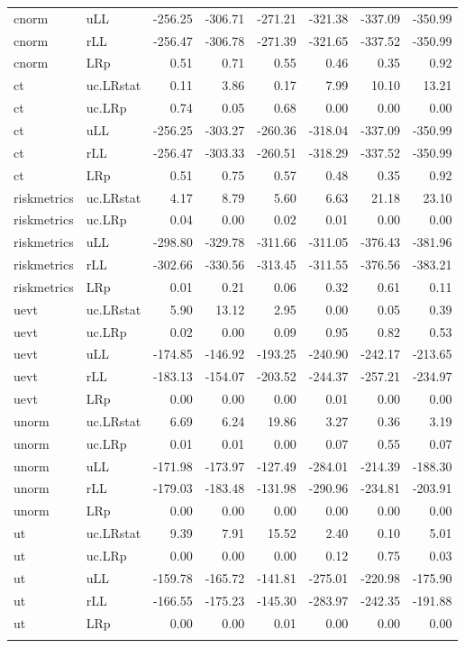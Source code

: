\begin{longtable}{llrrrrrr}
  cnorm & uLL & -256.25 & -306.71 & -271.21 & -321.38 & -337.09 & -350.99 \\ 
  cnorm & rLL & -256.47 & -306.78 & -271.39 & -321.65 & -337.52 & -350.99 \\ 
  cnorm & LRp & 0.51 & 0.71 & 0.55 & 0.46 & 0.35 & 0.92 \\ 
  ct & uc.LRstat & 0.11 & 3.86 & 0.17 & 7.99 & 10.10 & 13.21 \\ 
  ct & uc.LRp & 0.74 & 0.05 & 0.68 & 0.00 & 0.00 & 0.00 \\ 
  ct & uLL & -256.25 & -303.27 & -260.36 & -318.04 & -337.09 & -350.99 \\ 
  ct & rLL & -256.47 & -303.33 & -260.51 & -318.29 & -337.52 & -350.99 \\ 
  ct & LRp & 0.51 & 0.75 & 0.57 & 0.48 & 0.35 & 0.92 \\ 
  riskmetrics & uc.LRstat & 4.17 & 8.79 & 5.60 & 6.63 & 21.18 & 23.10 \\ 
  riskmetrics & uc.LRp & 0.04 & 0.00 & 0.02 & 0.01 & 0.00 & 0.00 \\ 
  riskmetrics & uLL & -298.80 & -329.78 & -311.66 & -311.05 & -376.43 & -381.96 \\ 
  riskmetrics & rLL & -302.66 & -330.56 & -313.45 & -311.55 & -376.56 & -383.21 \\ 
  riskmetrics & LRp & 0.01 & 0.21 & 0.06 & 0.32 & 0.61 & 0.11 \\ 
  uevt & uc.LRstat & 5.90 & 13.12 & 2.95 & 0.00 & 0.05 & 0.39 \\ 
  uevt & uc.LRp & 0.02 & 0.00 & 0.09 & 0.95 & 0.82 & 0.53 \\ 
  uevt & uLL & -174.85 & -146.92 & -193.25 & -240.90 & -242.17 & -213.65 \\ 
  uevt & rLL & -183.13 & -154.07 & -203.52 & -244.37 & -257.21 & -234.97 \\ 
  uevt & LRp & 0.00 & 0.00 & 0.00 & 0.01 & 0.00 & 0.00 \\ 
  unorm & uc.LRstat & 6.69 & 6.24 & 19.86 & 3.27 & 0.36 & 3.19 \\ 
  unorm & uc.LRp & 0.01 & 0.01 & 0.00 & 0.07 & 0.55 & 0.07 \\ 
  unorm & uLL & -171.98 & -173.97 & -127.49 & -284.01 & -214.39 & -188.30 \\ 
  unorm & rLL & -179.03 & -183.48 & -131.98 & -290.96 & -234.81 & -203.91 \\ 
  unorm & LRp & 0.00 & 0.00 & 0.00 & 0.00 & 0.00 & 0.00 \\ 
  ut & uc.LRstat & 9.39 & 7.91 & 15.52 & 2.40 & 0.10 & 5.01 \\ 
  ut & uc.LRp & 0.00 & 0.00 & 0.00 & 0.12 & 0.75 & 0.03 \\ 
  ut & uLL & -159.78 & -165.72 & -141.81 & -275.01 & -220.98 & -175.90 \\ 
  ut & rLL & -166.55 & -175.23 & -145.30 & -283.97 & -242.35 & -191.88 \\ 
  ut & LRp & 0.00 & 0.00 & 0.01 & 0.00 & 0.00 & 0.00 \\ 
   \hline
\hline
\label{tab:vartest}
\end{longtable}

